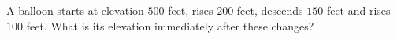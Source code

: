 A balloon starts at elevation $500$ feet, rises $200$ feet, descends $150$ feet and rises $100$ feet. What is its elevation immediately after these changes?
